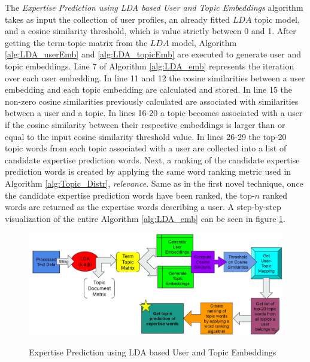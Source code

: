             The \emph{Expertise Prediction using LDA based User and Topic Embeddings} algorithm takes as input the collection of user profiles, an already fitted $LDA$ topic model, and a cosine similarity threshold, which is value strictly between 0 and 1. After getting the term-topic matrix from the $LDA$ model, Algorithm \ref{alg:LDA_userEmb} and \ref{alg:LDA_topicEmb} are executed to generate user and topic embeddings. Line 7 of Algorithm \ref{alg:LDA_emb} represents the iteration over each user embedding. In line 11 and 12 the cosine similarities between a user embedding and each topic embedding are calculated and stored. In line 15 the non-zero cosine similarities previously calculated are associated with similarities between a user and a topic. In lines 16-20 a topic becomes associated with a user if the cosine similarity between their respective embeddings is larger than or equal to the input cosine similarity threshold value. In lines 26-29 the top-20 topic words from each topic associated with a user are collected into a list of candidate expertise prediction words. Next, a ranking of the candidate expertise prediction words is created by applying the same word ranking metric used in Algorithm \ref{alg:Topic_Distr}, \emph{relevance}. Same as in the first novel technique, once the candidate expertise prediction words have been ranked, the top-$n$ ranked words are returned as the expertise words describing a user. A step-by-step visualization of the entire Algorithm \ref{alg:LDA_emb} can be seen in figure \ref{fig:technique2}.
             
            \begin{figure}[!ht]
              \centering
              \includegraphics[width=\textwidth]{figures/technique2.JPG}\\
              \caption{Expertise Prediction using LDA based User and Topic Embeddings}
              \label{fig:technique2}
            \end{figure}
            
